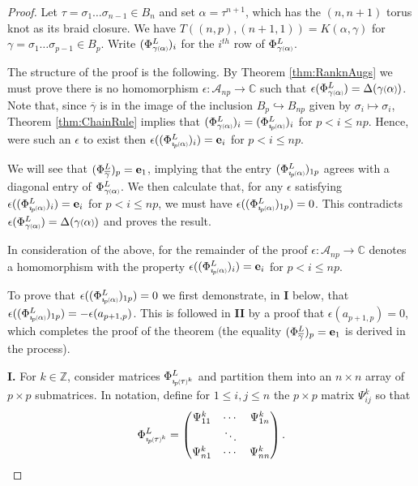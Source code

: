\documentclass[11pt]{amsart}
\def\Z{{\mathbb Z}}
\def\C{{\mathbb C}}
\def\A{{\mathcal A}}
\def\s{{\sigma}}
\newcommand*{\smallp}[1]{\scalebox{.75}{\ensuremath#1}}
\newcommand*{\subsmallp}[1]{\scalebox{.5}{\ensuremath#1}}
\newcommand{\subpp}[2][p]{\imath_{\hspace*{-1pt}#1}\hspace*{-.5pt}\subsmallp(#2\subsmallp)}
\theoremstyle{definition}
\begin{document}
\begin{proof}
Let $\tau = \s_1\ldots\s_{n-1}\in B_n$ and set $\alpha = \tau^{n+1}$, which has the $(n,n+1)$ torus knot as its braid closure. We have $T((n,p),(n+1,1)) = K(\alpha,\gamma)$ for $\gamma=\s_1\ldots\s_{p-1}\in B_p$. Write $(\Phi_{\gamma\subsmallp(\alpha\subsmallp)}^L)_i$ for the $i^{th}$ row of $\Phi_{\gamma\subsmallp(\alpha\subsmallp)}^L$.

The structure of the proof is the following. By Theorem \ref{thm:RanknAugs} we must prove there is no homomorphism $\epsilon:\A_{np}\to\C$ such that $\epsilon(\Phi_{\gamma\subsmallp(\alpha\subsmallp)}^L)=\Delta(\gamma\smallp(\alpha\smallp))$. Note that, since $\overline\gamma$ is in the image of the inclusion $B_p\hookrightarrow B_{np}$ given by $\s_i\mapsto\s_i$, Theorem \ref{thm:ChainRule} implies that $(\Phi_{\gamma\subsmallp(\alpha\subsmallp)}^L)_i=(\Phi_{\subpp\alpha}^L)_i$ for $p<i\le np$. Hence, were such an $\epsilon$ to exist then $\epsilon((\Phi_{\subpp\alpha}^L)_i) = {\bf e}_{i}$ for $p < i \le np$. 

We will see that $(\Phi_{\overline\gamma}^L)_p={\bf e}_1$, implying that the entry $(\Phi_{\subpp\alpha}^L)_{1p}$ agrees with a diagonal entry of $\Phi_{\gamma\subsmallp(\alpha\subsmallp)}^L$. We then calculate that, for any $\epsilon$ satisfying $\epsilon((\Phi_{\subpp\alpha}^L)_i) = {\bf e}_{i}$ for $p < i \le np$, we must have $\epsilon((\Phi_{\subpp\alpha}^L)_{1p})=0$. This contradicts $\epsilon(\Phi_{\gamma\subsmallp(\alpha\subsmallp)}^L) = \Delta(\gamma\smallp(\alpha\smallp))$ and proves the result.

In consideration of the above, for the remainder of the proof $\epsilon:\A_{np}\to\C$ denotes a homomorphism with the property $\epsilon((\Phi_{\subpp\alpha}^L)_i) = {\bf e}_{i}$ for $p < i \le np$.

To prove that $\epsilon((\Phi_{\subpp\alpha}^L)_{1p})=0$ we first demonstrate, in {\bf I} below, that $\epsilon((\Phi_{\subpp\alpha}^L)_{1p})=-\epsilon(a_{p+1,p})$. This is followed in {\bf II} by a proof that $\epsilon(a_{p+1,p})=0$, which completes the proof of the theorem (the equality $(\Phi_{\overline\gamma}^L)_p={\bf e}_1$ is derived in the process).

{\bf I.} For $k\in\Z$, consider matrices $\Phi_{\subpp\tau^k}^L$ and partition them into an $n\times n$ array of $p\times p$ submatrices. In notation, define for $1\le i,j\le n$ the $p\times p$ matrix $\Psi_{ij}^k$ so that
    \[ \Phi_{\subpp\tau^k}^L = \begin{pmatrix}\Psi_{11}^k & \cdots & \Psi_{1n}^k \\ & \ddots & \\ \Psi_{n1}^k & \cdots & \Psi_{nn}^k\end{pmatrix}.\]


\end{proof}
\end{document}
